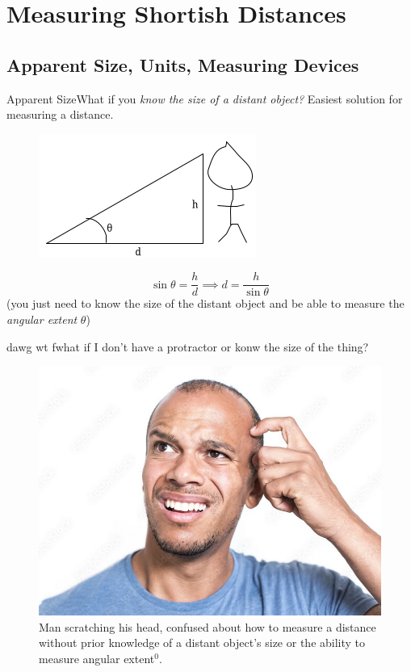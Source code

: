 \documentclass[12pt]{beamer}
\begin{document}
\section{Measuring Shortish Distances}
    \subsection{Apparent Size, Units, Measuring Devices}
        \begin{frame}{Apparent Size}{What if you \textit{know the size of a distant object?}} \centering
            Easiest solution for measuring a distance.
            \begin{figure}
                \includegraphics[scale=0.6, bb=0 0 280 160]{angletriangle.png}
            \end{figure}
            \pause
            \[\sin{\theta}=\frac{h}{d} \implies d=\frac{h}{\sin{\theta}}\]
            \pause
            (you just need to know the size of the distant object and be able to measure the \textit{angular extent} $\theta$)
        \end{frame}
        \begin{frame}{dawg wt f}{what if I don't have a protractor or konw the size of the thing?}
            \begin{figure}
                \includegraphics[scale=0.2, bb=0 0 800 600]{confused.png}
                \caption{Man scratching his head, confused about how to measure a distance without prior knowledge of a distant object's size or the ability to measure angular extent$^0$.}
            \end{figure}
        \end{frame}
\end{document}
